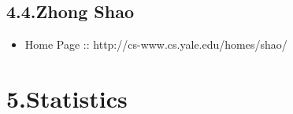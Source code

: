 \documentclass[12pt,twoside]{article}
\begin{document}
\subsection{4.4.\hspace*{0.5em}Zhong Shao}\label{sec-zhong-shao}%

\begin{itemize}[noitemsep,topsep=\mdcompacttopsep]%

\item{}Home Page :: http://cs-www.cs.yale.edu/homes/shao/%
\end{itemize}%

\section{5.\hspace*{0.5em}Statistics}\label{sec-statistics}%
\end{document}
